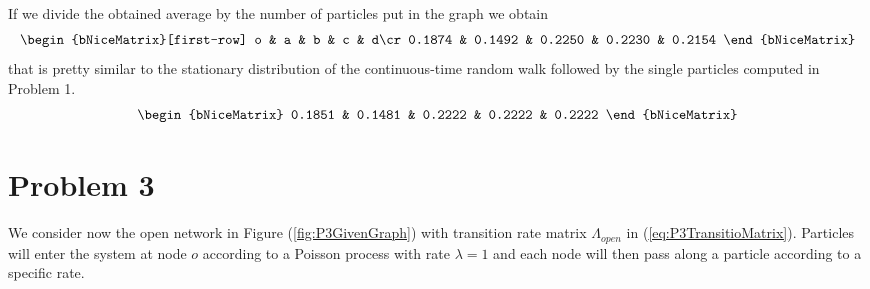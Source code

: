 \documentclass[
	12pt, %
]{fphw}
\begin{document}
\begin{enumerate}[(a\normalfont)]
    If we divide the obtained average by the number of particles put in the graph we obtain 
    $$
    \begin{bNiceMatrix}[first-row]
        o & a & b & c & d\cr
        0.1874 & 0.1492 & 0.2250 & 0.2230 & 0.2154
    \end{bNiceMatrix}
    $$
    that is pretty similar to the stationary distribution of the continuous-time random walk followed by the single particles computed in Problem 1.
    $$
    \begin{bNiceMatrix}
    0.1851 & 0.1481 & 0.2222 & 0.2222 & 0.2222
    \end{bNiceMatrix}
    $$
\end{enumerate}

\section*{Problem 3}
We consider now the open network in Figure (\ref{fig:P3GivenGraph}) with transition rate matrix $\Lambda_{open}$ in (\ref{eq:P3TransitioMatrix}).
Particles will enter the system at node $o$ according to a Poisson process with rate $\lambda = 1$ and each node will then pass along a particle according to a specific rate.
\end{document}
